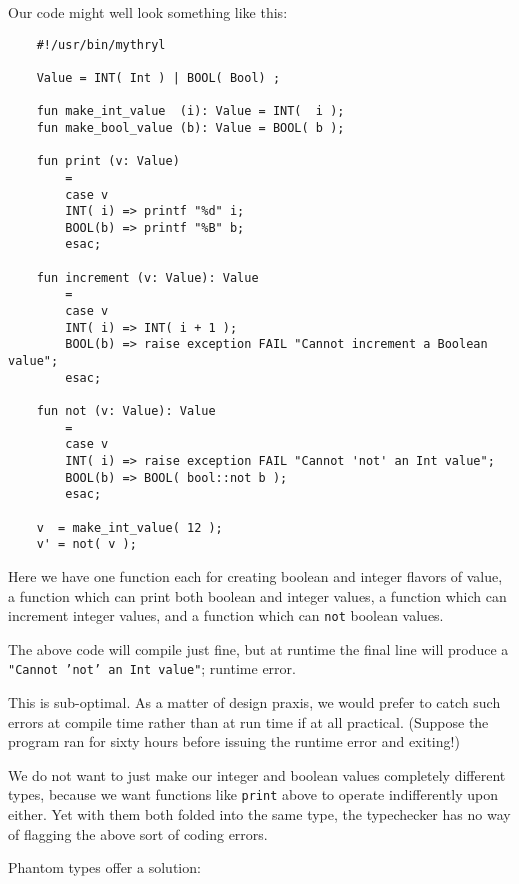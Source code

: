 Our code might well look something like this:
\begin{verbatim}
    #!/usr/bin/mythryl

    Value = INT( Int ) | BOOL( Bool) ; 

    fun make_int_value  (i): Value = INT(  i );
    fun make_bool_value (b): Value = BOOL( b );

    fun print (v: Value)
        =
        case v
        INT( i) => printf "%d" i;
        BOOL(b) => printf "%B" b;
        esac;
       
    fun increment (v: Value): Value
        =
        case v
        INT( i) => INT( i + 1 );
        BOOL(b) => raise exception FAIL "Cannot increment a Boolean value";
        esac;

    fun not (v: Value): Value
        =
        case v
        INT( i) => raise exception FAIL "Cannot 'not' an Int value";
        BOOL(b) => BOOL( bool::not b );
        esac;

    v  = make_int_value( 12 );
    v' = not( v );
\end{verbatim}

Here we have one function each for creating boolean and integer flavors of 
value, a function which can print both boolean and integer values, a 
function which can increment integer values, and a function which can 
{\tt not} boolean values.

The above code will compile just fine, but at runtime the final line 
will produce a {\tt "Cannot 'not' an Int value"}; runtime error.

This is sub-optimal.  As a matter of design praxis, we would prefer to 
catch such errors at compile time rather than at run time if at all 
practical.  (Suppose the program ran for sixty hours before issuing 
the runtime error and exiting!)

We do not want to just make our integer and boolean values completely 
different types, because we want functions like {\tt print} above to 
operate indifferently upon either.  Yet with them both folded into the 
same type, the typechecker has no way of flagging the above sort of 
coding errors.

Phantom types offer a solution:

